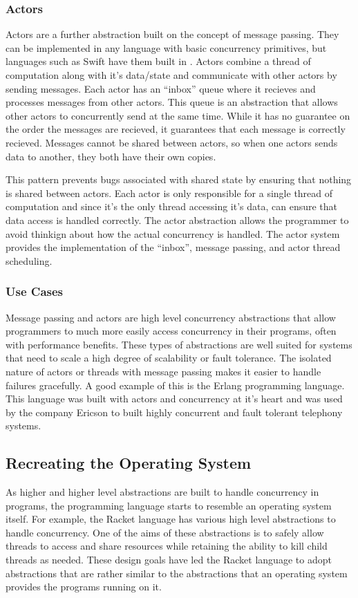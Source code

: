 \documentclass{article}
\begin{document}
\subsubsection{Actors}
Actors are a further abstraction built on the concept of message
passing. They can be implemented in any language with basic
concurrency primitives, but languages such as Swift have them built
in \cite{Swift}. Actors combine a thread of computation along with it's
data/state and communicate with other actors by sending messages.
Each actor has an ``inbox'' queue where it recieves and processes
messages from other actors. This queue is
an abstraction that allows other actors to concurrently send
at the same time. While it has no guarantee on the order the
messages are recieved, it guarantees that each message is correctly
recieved. Messages cannot be shared between actors, so when one
actors sends data to another, they both have their own copies.
\cite{Coursera}

This pattern prevents bugs associated with shared state by ensuring
that nothing is shared between actors. Each actor is only
responsible for a single thread of computation and since it's the
only thread accessing it's data, can ensure that data access is
handled correctly. The actor abstraction allows the programmer to
avoid thinkign about how the actual concurrency is handled. The
actor system provides the implementation of the ``inbox'', message
passing, and actor thread scheduling.

\subsubsection{Use Cases}
Message passing and actors are high level concurrency abstractions
that allow programmers to much more easily access concurrency
in their programs, often with performance benefits. These types
of abstractions are well suited for systems that need to scale
a high degree of scalability or fault tolerance. The isolated
nature of actors or threads with message passing makes it easier
to handle failures gracefully. A good example of this is the Erlang
programming language. This language was built with actors and
concurrency at it's heart and was used by the company Ericson to
built highly concurrent and fault tolerant telephony systems.
\cite{TuftsCS21, Coursera}

\subsection{Recreating the Operating System}
As higher and higher level abstractions are built to handle
concurrency in programs, the programming language starts
to resemble an operating system itself. For example, the Racket
language has various high level abstractions to handle concurrency.
One of the aims of these abstractions is to safely allow threads to
access and share resources while retaining the ability to kill child
threads as needed. These design goals have led the Racket language
to adopt abstractions that are rather similar to the abstractions
that an operating system provides the programs running on it.
\cite{LispMachine, KillSafe}
\end{document}

